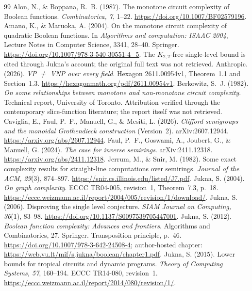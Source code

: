 \documentclass[11pt]{article}
\theoremstyle{definition}
\theoremstyle{remark}
\begin{document}
\begin{thebibliography}{99}
Alon, N., \& Boppana, R.~B. (1987). The monotone circuit complexity of Boolean functions. \emph{Combinatorica, 7}, 1--22. \url{https://doi.org/10.1007/BF02579196}.
Amano, K., \& Maruoka, A. (2004). On the monotone circuit complexity of quadratic Boolean functions. In \emph{Algorithms and computation: ISAAC 2004}, Lecture Notes in Computer Science, 3341, 28--40. Springer. \url{https://doi.org/10.1007/978-3-540-30551-4_5}. The $K_{2,2}$-free single-level bound is cited through Jukna's account; the original full text was not retrieved.
Anthropic. (2026). \emph{VP $\ne$ VNP over every field}. Hexagon 2611.00954v1, Theorem~1.1 and Section~1.3. \url{https://hexagonmath.org/pdf/2611.00954v1}.
Berkowitz, S.~J. (1982). \emph{On some relationships between monotone and non-monotone circuit complexity}. Technical report, University of Toronto. Attribution verified through the contemporary slice-function literature; the report itself was not retrieved.
Caviglia, E., Faul, P.~F., Manuell, G., \& Mesiti, L. (2026). \emph{Clifford semigroups and the monoidal Grothendieck construction} (Version~2). arXiv:2607.12944. \url{https://arxiv.org/abs/2607.12944}.
Faul, P.~F., Goswami, A., Joubert, G., \& Manuell, G. (2024). \emph{The case for inverse semirings}. arXiv:2411.12318. \url{https://arxiv.org/abs/2411.12318}.
Jerrum, M., \& Snir, M. (1982). Some exact complexity results for straight-line computations over semirings. \emph{Journal of the ACM, 29}(3), 874--897. \url{https://snir.cs.illinois.edu/listed/J7.pdf}.
Jukna, S. (2004). \emph{On graph complexity}. ECCC TR04-005, revision~1, Theorem~7.3, p.~18. \url{https://eccc.weizmann.ac.il/report/2004/005/revision/1/download/}.
Jukna, S. (2006). Disproving the single level conjecture. \emph{SIAM Journal on Computing, 36}(1), 83--98. \url{https://doi.org/10.1137/S0097539705447001}.
Jukna, S. (2012). \emph{Boolean function complexity: Advances and frontiers}. Algorithms and Combinatorics, 27. Springer. Transposition principle, p.~46. \url{https://doi.org/10.1007/978-3-642-24508-4}; author-hosted chapter: \url{https://web.vu.lt/mif/s.jukna/boolean/chapter1.pdf}.
Jukna, S. (2015). Lower bounds for tropical circuits and dynamic programs. \emph{Theory of Computing Systems, 57}, 160--194. ECCC TR14-080, revision~1. \url{https://eccc.weizmann.ac.il/report/2014/080/revision/1/}.

\end{thebibliography}
\end{document}
